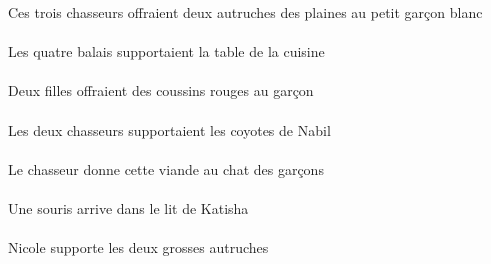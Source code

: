 \begin{exe}
Ces trois chasseurs offraient deux autruches des plaines au petit garçon blanc
\ex\gll
\DEFPlErg{}   \quatreAPl{}   \balaiAPlErg{}   \DEFSgAbs{}    \DEFSgObl{}   \cuisineDSgObl{}   \DE{}   \tableDSgAbs{}  \supporterVtPstDSg{}\\
\DEFPlErgP{}   \quatreAPlP{}   \balaiAPlErgP{}   \DEFSgAbsP{}    \DEFSgOblP{}   \cuisineDSgOblP{}   \DEP{}   \tableDSgAbsP{}  \supporterVtPstDSgP{}\\
Les quatre balais supportaient la table de la cuisine
\ex\gll
\INDDuErg{}   \filleCDuErg{}    \DEFSgDat{}   \garconDSgDat{}   \INDPlAbs{}   \rougeBPl{}   \coussinBPlAbs{}  \offrirVdPstBPl{}\\
\INDDuErgP{}   \filleCDuErgP{}    \DEFSgDatP{}   \garconDSgDatP{}   \INDPlAbsP{}   \rougeBPlP{}   \coussinBPlAbsP{}  \offrirVdPstBPlP{}\\
Deux filles offraient des coussins rouges au garçon
\ex\gll
\DEFDuErg{}   \chasseurCDuErg{}   \DEFPlAbs{}    \INDSgObl{}   \NabilDSgObl{}   \DE{}   \coyoteCPlAbs{}  \supporterVtPstCPl{}\\
\DEFDuErgP{}   \chasseurCDuErgP{}   \DEFPlAbsP{}    \INDSgOblP{}   \NabilDSgOblP{}   \DEP{}   \coyoteCPlAbsP{}  \supporterVtPstCPlP{}\\
Les deux chasseurs supportaient les coyotes de Nabil
\ex\gll
\DEFSgErg{}   \chasseurCSgErg{}    \DEFSgDat{}    \DEFPlObl{}   \garconDPlObl{}   \DE{}   \chatDSgDat{}   \DEMSgAbs{}   \viandeASgAbs{}  \donnerVdPrsASg{}\\
\DEFSgErgP{}   \chasseurCSgErgP{}    \DEFSgDatP{}    \DEFPlOblP{}   \garconDPlOblP{}   \DEP{}   \chatDSgDatP{}   \DEMSgAbsP{}   \viandeASgAbsP{}  \donnerVdPrsASgP{}\\
Le chasseur donne cette viande au chat des garçons
\ex\gll
\INDSgAbs{}   \sourisBSgAbs{}    \DEFSgObl{}    \INDSgObl{}   \KatishaASgObl{}   \DE{}   \litDSgObl{}   \DANS{}  \arriverViPrsBSg{}\\
\INDSgAbsP{}   \sourisBSgAbsP{}    \DEFSgOblP{}    \INDSgOblP{}   \KatishaASgOblP{}   \DEP{}   \litDSgOblP{}   \DANSP{}  \arriverViPrsBSgP{}\\
Une souris arrive dans le lit de Katisha
\ex\gll
\INDSgErg{}   \NicoleBSgErg{}   \DEFDuAbs{}   \grosBDu{}   \autrucheBDuAbs{}  \supporterVtPrsBDu{}\\
\INDSgErgP{}   \NicoleBSgErgP{}   \DEFDuAbsP{}   \grosBDuP{}   \autrucheBDuAbsP{}  \supporterVtPrsBDuP{}\\
Nicole supporte les deux grosses autruches
\ex\gll
\DEFSgObl{}   \cuisineDSgObl{}   \DANS{}   \INDDuErg{}   \maigreCDu{}   \chasseurCDuErg{}    \INDSgDat{}   \KatishaASgDat{}   \INDPlAbs{}   \jauneCPl{}   \oeufCPlAbs{}  \lancerVdPstCPl{}\\

\end{exe}
